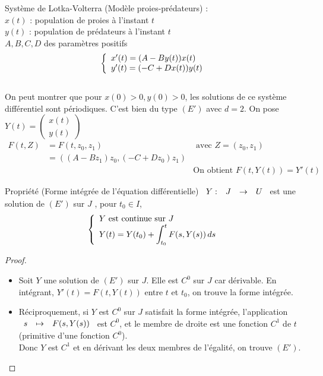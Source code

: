 \documentclass[]{report}
\begin{document}
\begin{ex}
    Système de Lotka-Volterra (Modèle proies-prédateurs) :\\
    $x(t)$ : population de proies à l'instant $t$\\
    $y(t)$ : population de prédateurs à l'instant $t$\\
    $A,B,C,D$ des paramètres positifs\\
    $$\left\{\begin{array}{ll} x'(t)=(A-By(t))x(t)\\
    y'(t)=(-C+Dx(t))y(t) \end{array} \right.$$\\
    On peut montrer que pour $x(0)>0,y(0)>0$, les solutions de ce système différentiel sont périodiques. C'est bien du type $(E')$ avec $d=2$. On pose $Y(t)=\begin{pmatrix}
        x(t)\\
        y(t)
    \end{pmatrix}$\\
    \begin{align*}
    F(t,Z)&=F(t,z_0,z_1)&\text{ avec } Z=(z_0,z_1)\\
    &=((A-Bz_1)z_0,(-C+Dz_0)z_1)&\\
    &&\text{On obtient } F(t,Y(t))=Y'(t)
    \end{align*}
\end{ex}

\begin{prop}{Propriété (Forme intégrée de l'équation différentielle)}{}
    $\begin{array}{ccccc} Y : & J & \to & U \end{array}$ est une solution de $(E')$ sur $J$ \ssi, pour $t_0\in I$,\\
    $$\left\{\begin{array}{ll} Y \text{ est continue sur }J\\
    \displaystyle{Y(t)=Y(t_0)+\int_{t_0}^tF(s,Y(s))\,ds} \end{array} \right.$$
\end{prop}

\begin{proof}
    \begin{itemize}
        \item Soit $Y$ une solution de $(E')$ sur $J$. Elle est $C^0$ sur $J$ car dérivable. En intégrant, $Y'(t)=F(t,Y(t))$ entre $t$ et $t_0$, on trouve la forme intégrée.
        \item Réciproquement, si $Y$ est $C^0$ sur $J$ satisfait la forme intégrée, l'application $\begin{array}{ccccc} s & \mapsto & F(s,Y(s)) \end{array}$ est $C^0$, et le membre de droite est une fonction $C^1$ de $t$ (primitive d'une fonction $C^0$).\\
        Donc $Y$ est $C^1$ et en dérivant les deux membres de l'égalité, on trouve $(E')$.
    \end{itemize}
\end{proof}
\end{document}
